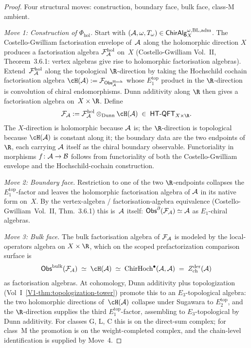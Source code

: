 \begin{proof}
Four structural moves: construction, boundary face, bulk face,
class-M ambient.

\emph{Move 1: Construction of $\Phi_{\mathrm{hol}}$.}
Start with $(\mathcal{A}, \omega, T_\omega) \in
\mathsf{ChirAlg}^{\omega,\mathrm{BL,adm}}_X$. The Costello-Gwilliam
factorisation envelope of~$\mathcal{A}$ along the holomorphic direction
$X$ produces a factorisation algebra
$\mathcal{F}_{\mathcal{A}}^{\mathrm{hol}}$ on~$X$ (Costello-Gwilliam Vol.~II,
Theorem~3.6.1: vertex algebras give rise to holomorphic
factorisation algebras). Extend~$\mathcal{F}_{\mathcal{A}}^{\mathrm{hol}}$ along
the topological $\R$-direction by taking the Hochschild cochain
factorisation algebra
$\cH(\cA) := \cF_{\Obs^{\mathrm{Hoch}}_\cA}$ whose $E_1^{\mathrm{top}}$
product in the $\R$-direction is convolution of chiral
endomorphisms. Dunn additivity along $\R$ then gives a factorisation
algebra on~$X \times \R$. Define
\[
 \cF_\cA := \cF_\cA^{\mathrm{hol}}
 \otimes_{\mathrm{Dunn}}
 \cH(\cA) \;\in\; \HTQFT_{X \times \R}.
\]
The $X$-direction is holomorphic because $\mathcal{A}$ is; the
$\R$-direction is topological because $\cH(\cA)$ is constant along
it; the boundary data are the two endpoints of~$\R$, each carrying
$\mathcal{A}$ itself as the chiral boundary observable.
Functoriality in morphisms $f \colon \mathcal{A} \to \mathcal{B}$ follows from
functoriality of both the Costello-Gwilliam envelope and the
Hochschild-cochain construction.

\emph{Move 2: Boundary face.}
Restriction to one of the two $\R$-endpoints collapses the
$E_1^{\mathrm{top}}$-factor and leaves the holomorphic
factorisation algebra of $\mathcal{A}$ in its native form on~$X$. By the
vertex-algebra / factorisation-algebra equivalence
(Costello-Gwilliam~Vol.~II, Thm.~3.6.1) this is~$\mathcal{A}$ itself:
$\mathsf{Obs}^\partial(\mathcal{F}_{\mathcal{A}}) \simeq \mathcal{A}$ as $E_1$-chiral algebras.

\emph{Move 3: Bulk face.}
The bulk factorisation algebra of $\mathcal{F}_{\mathcal{A}}$ is modeled by the
local-operators algebra on $X \times \R$, which on the scoped
prefactorization comparison surface is
\[
 \Obs^{\mathrm{bulk}}(\cF_\cA)
 \;\simeq\;
 \cH(\cA)
 \;\simeq\;
 \ChirHoch^\bullet(\cA, \cA)
 \;=\;
 \Zder(\cA)
\]
as factorisation algebras. At cohomology, Dunn additivity plus
topologization (Vol~I~\ref*{V1-thm:topologization-tower}) promote
this to an $E_3$-topological algebra: the two holomorphic
directions of~$\cH(\cA)$ collapse under Sugawara to
$E_2^{\mathrm{top}}$, and the $\R$-direction supplies the third
$E_1^{\mathrm{top}}$-factor, assembling to $E_3$-topological by
Dunn additivity. For classes G, L, C this is on the direct-sum
complex; for class~M the promotion is on the weight-completed
complex, and the chain-level identification is supplied by
Move~4.


\end{proof}
